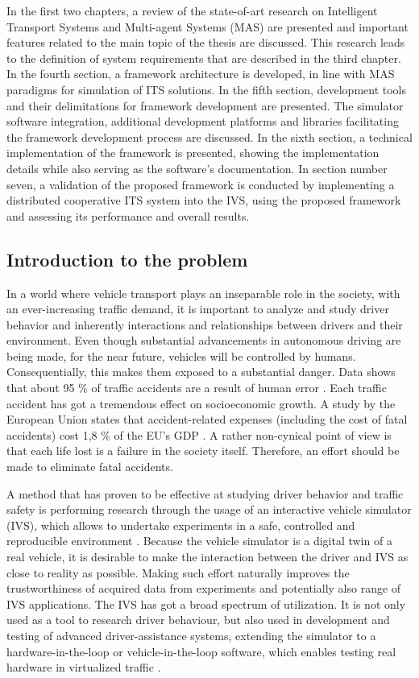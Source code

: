 \documentclass[titlepage, 12pt]{article}
\begin{document}
In the first two chapters, a review of the state-of-art research on Intelligent Transport
Systems and Multi-agent Systems (MAS) are presented and important features related
to the main topic of the thesis are discussed. This research leads to the definition of system requirements
that are described in the third chapter. In the fourth section, a framework architecture 
is developed, in line with MAS paradigms for simulation of ITS solutions. In the fifth
section, development tools and their delimitations for framework development are presented.
The simulator software integration, additional development platforms and
libraries facilitating the framework development process are discussed. In the sixth section,
a technical implementation of the framework is presented, showing the implementation details
while also serving as the software's documentation. In section number seven, a validation of
the proposed framework is conducted by implementing a distributed cooperative ITS system into the
IVS, using the proposed framework and assessing its performance and overall results.

\subsection{Introduction to the problem}

In a world where vehicle transport plays an inseparable role in the society, with an ever-increasing
traffic demand, it is important to analyze and study driver behavior and inherently interactions and
relationships between drivers and their environment. Even though
substantial advancements in autonomous driving are being made, for the near future, vehicles 
will be controlled by humans. Consequentially, this makes them exposed to a substantial danger. 
Data shows that about 95 \% of traffic accidents are a result of human error \cite{Parliament2021}. 
Each traffic accident has got a tremendous effect on socioeconomic growth. A study by the European
Union states that accident-related expenses (including the cost of fatal accidents) cost 1,8 \% of the EU's GDP \cite{Wijnen2017}.  
A rather non-cynical point of view is that each life lost is a failure in the society itself.
Therefore, an effort should be made to eliminate fatal accidents.

A method that has proven to be effective at studying driver behavior and traffic safety is 
performing research through the usage of an interactive vehicle simulator (IVS), which allows to undertake experiments in a safe,
controlled and reproducible environment \cite{Winter2012}. Because the vehicle simulator is a digital
twin of a real vehicle, it is desirable to make the interaction between the driver
and IVS as close to reality as possible. Making such effort naturally improves the trustworthiness of
acquired data from experiments and potentially also range of IVS applications. The IVS has
got a broad spectrum of utilization. It is not only used as a tool to research driver
behaviour, but also used in development and testing of advanced driver-assistance systems,
extending the simulator to a hardware-in-the-loop or vehicle-in-the-loop software, which
enables testing real hardware in virtualized traffic \cite{Horvath2019}.
\end{document}

